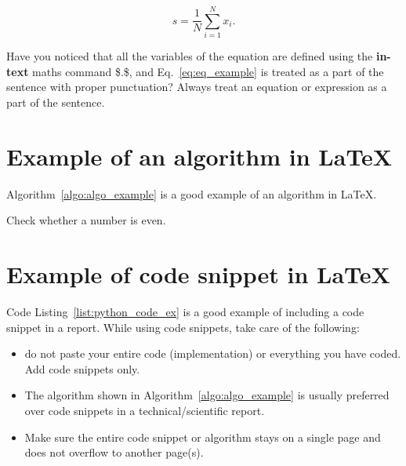 \begin{equation}
\label{eq:eq_example} %
s = \frac{1}{N} \sum_{i = 1}^{N} x_i. 
\end{equation}

Have you noticed that all the variables of the equation are defined using the \textbf{in-text} maths command \$.\$, and Eq.~\eqref{eq:eq_example} is treated as a part of the sentence with proper punctuation? Always treat an equation or expression as a part of the sentence. 


\section*{Example of an algorithm in \LaTeX}
Algorithm~\ref{algo:algo_example} is a good example of an algorithm in \LaTeX.  
\begin{algorithm}
    \caption{Example caption: sum of all even numbers}
    \label{algo:algo_example}
    \begin{algorithmic}[1]
        \Statex
          \Comment Check whether a number is even.
        \EndIf
        \EndFor
        \State {}
        \EndFunction
    \end{algorithmic}
\end{algorithm}
 
\section*{Example of code snippet  in \LaTeX}

Code Listing~\ref{list:python_code_ex} is a good example of including a code snippet in a report. While using code snippets, take care of the following:
\begin{itemize}
    \item do not paste your entire code (implementation) or everything you have coded. Add code snippets only. 
    \item The algorithm shown in Algorithm~\ref{algo:algo_example} is usually preferred over code snippets in a technical/scientific report. 
    \item Make sure the entire code snippet or algorithm stays on a single page and does not overflow to another page(s).  
\end{itemize}

